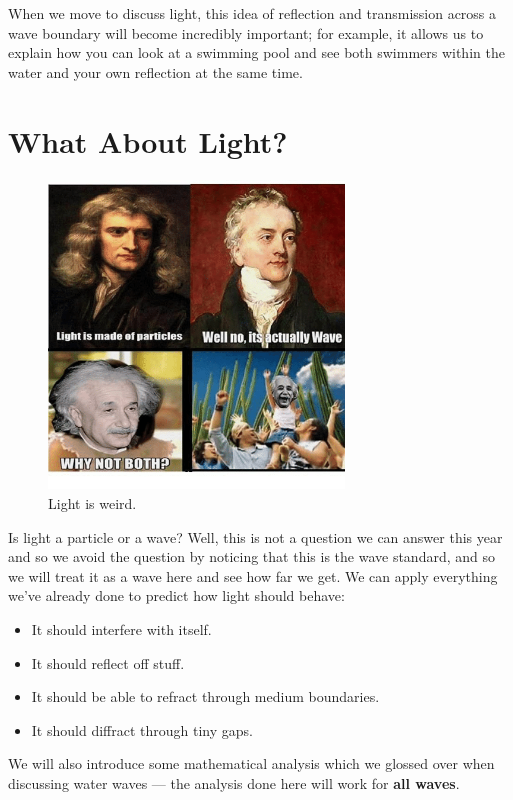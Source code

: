 \documentclass[a4paper]{amsbook}
\newcommand\capcite[1]{}
\begin{document}
When we move to discuss light, this idea of reflection and transmission across a wave boundary will become incredibly important;
for example, it allows us to explain how you can look at a swimming pool and see both swimmers within the water and your own reflection
at the same time.

\section{What About Light?}
\begin{figure}
  \centering
  \includegraphics[width=0.7\textwidth]{lightisweird}
  \caption{Light is weird. \capcite{https://pics.onsizzle.com/Instagram-109383.png}\label{fig:lightisweird}}
\end{figure}
Is light a particle or a wave? Well, this is not a question we can answer this year and so we avoid the question by noticing that this
is the wave standard, and so we will treat it as a wave here and see how far we get. We can apply everything we've already done to predict
how light should behave:
\begin{itemize}
  \item It should interfere with itself.
  \item It should reflect off stuff.
  \item It should be able to refract through medium boundaries.
  \item It should diffract through tiny gaps.
\end{itemize}

We will also introduce some mathematical analysis which we glossed over when discussing water waves --- the analysis
done here will work for \textbf{all waves}.
\end{document}
